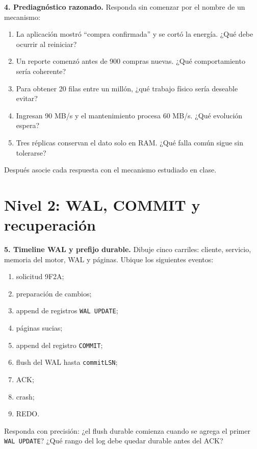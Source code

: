 \documentclass[variant=guia,cover=institutional,mode=screen]{ua-engineering-v6-article}
\begin{document}
\begin{uaexercise}
\textbf{4. Prediagnóstico razonado.} Responda sin comenzar por el nombre de un mecanismo:

\begin{enumerate}
\item La aplicación mostró ``compra confirmada'' y se cortó la energía. ¿Qué debe ocurrir al reiniciar?
\item Un reporte comenzó antes de 900 compras nuevas. ¿Qué comportamiento sería coherente?
\item Para obtener 20 filas entre un millón, ¿qué trabajo físico sería deseable evitar?
\item Ingresan 90 MB/s y el mantenimiento procesa 60 MB/s. ¿Qué evolución espera?
\item Tres réplicas conservan el dato solo en RAM. ¿Qué falla común sigue sin tolerarse?
\end{enumerate}

Después asocie cada respuesta con el mecanismo estudiado en clase.
\end{uaexercise}

\section{Nivel 2: WAL, COMMIT y recuperación}

\begin{uaexercise}
\textbf{5. Timeline WAL y prefijo durable.} Dibuje cinco carriles: cliente, servicio, memoria del motor, WAL y páginas. Ubique los siguientes eventos:

\begin{enumerate}
\item solicitud 9F2A;
\item preparación de cambios;
\item append de registros \texttt{WAL UPDATE};
\item páginas sucias;
\item append del registro \texttt{COMMIT};
\item flush del WAL hasta \texttt{commitLSN};
\item ACK;
\item crash;
\item REDO.
\end{enumerate}

Responda con precisión: ¿el flush durable comienza cuando se agrega el primer \texttt{WAL UPDATE}? ¿Qué rango del log debe quedar durable antes del ACK?
\end{uaexercise}
\end{document}
